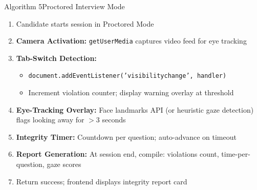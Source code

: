 \documentclass{beamer}
\begin{document}
\begin{frame}{Algorithm 5}{Proctored Interview Mode}
\begin{enumerate}
    \item Candidate starts session in Proctored Mode

    \item \textbf{Camera Activation:} \texttt{getUserMedia} captures video feed for eye tracking

    \item \textbf{Tab-Switch Detection:}
    \begin{itemize}
        \item \texttt{document.addEventListener('visibilitychange', handler)}
        \item Increment violation counter; display warning overlay at threshold
    \end{itemize}

    \item \textbf{Eye-Tracking Overlay:} Face landmarks API (or heuristic gaze detection) flags looking away for $>$3 seconds

    \item \textbf{Integrity Timer:} Countdown per question; auto-advance on timeout

    \item \textbf{Report Generation:} At session end, compile: violations count, time-per-question, gaze scores

    \item Return success; frontend displays integrity report card
\end{enumerate}
\end{frame}
\end{document}
